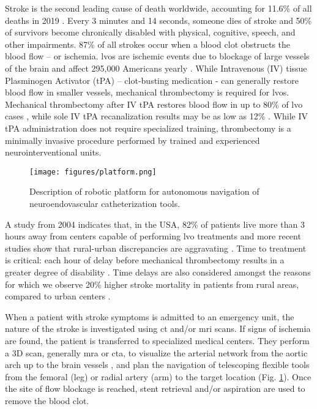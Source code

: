 Stroke is the second leading cause of death worldwide, accounting for 11.6\% of all deaths in 2019 \cite{Rai2023UpdatedCare}. Every 3 minutes and 14 seconds, someone dies of stroke \cite{2023StrokeFacts.} and 50\% of survivors become chronically disabled \cite{Donkor2018StrokeLife.} with physical, cognitive, speech, and other impairments. 87\% of all strokes occur when a blood clot obstructs the blood flow – or ischemia. \glspl{lvo} are ischemic events due to blockage of large vessels of the brain and affect 295,000 Americans yearly \cite{2023StrokeFacts.}. While Intravenous (IV) tissue Plasminogen Activator (tPA) – clot-busting medication - can generally restore blood flow in smaller vessels, mechanical thrombectomy is required for \glspl{lvo}. Mechanical thrombectomy after IV tPA restores blood flow in up to 80\% of \gls{lvo} cases \cite{LeeH.Schwamm2017EndovascularOutcomes}, while sole IV tPA recanalization results may be as low as 12\% \cite{LeeH.Schwamm2017EndovascularOutcomes}. While IV tPA administration does not require specialized training, thrombectomy is a minimally invasive procedure performed by trained and experienced neurointerventional units. 

\begin{figure}
    \centering
    \texttt{[image: figures/platform.png]}
    \caption{Description of robotic platform for autonomous navigation of neuroendovascular catheterization tools.}
    \label{fig:platform}
\end{figure}

A study from 2004 indicates that, in the USA, 82\% of patients live more than 3 hours away from centers capable of performing \gls{lvo} treatments \cite{Peterman2022GeospatialStates} and more recent studies show that rural-urban discrepancies are aggravating \cite{Hammond2020Urban-RuralMortality}. Time to treatment is critical: each hour of delay before mechanical thrombectomy results in a greater degree of disability \cite{Powers2019GuidelinesAssociation}. Time delays are also considered amongst the reasons for which we observe 20\% higher stroke mortality in patients from rural areas, compared to urban centers \cite{Llanos-Leyton2022DisparitiesStroke}. 

When a patient with stroke symptoms is admitted to an emergency unit, the nature of the stroke is investigated using \gls{ct} and/or \gls{mri} scans. If signs of ischemia are found, the patient is transferred to specialized medical centers. They perform a 3D scan, generally \gls{mra} or \gls{cta}, to visualize the arterial network from the aortic arch up to the brain vessels \cite{vanderZijden2019CurrentClinician}, and plan the navigation of telescoping flexible tools from the femoral (leg) or radial artery (arm) to the target location (Fig. \ref{fig:platform}). Once the site of flow blockage is reached, stent retrieval and/or aspiration are used to remove the blood clot.

